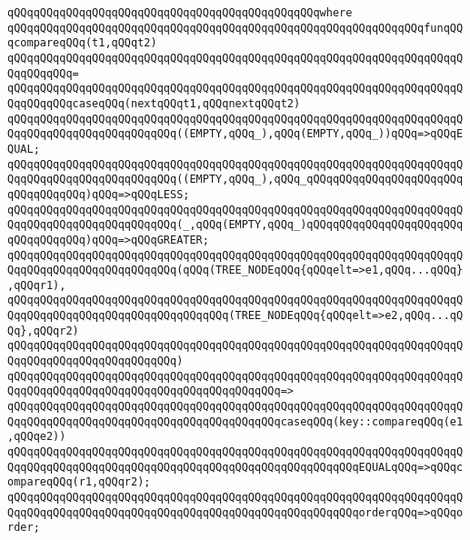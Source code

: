 \verb|qQQqqQQqqQQqqQQqqQQqqQQqqQQqqQQqqQQqqQQqqQQqqQQqwhere|\newline
\newline
\verb|qQQqqQQqqQQqqQQqqQQqqQQqqQQqqQQqqQQqqQQqqQQqqQQqqQQqqQQqqQQqqQQqfunqQQqcompareqQQq(t1,qQQqt2)|\newline
\verb|qQQqqQQqqQQqqQQqqQQqqQQqqQQqqQQqqQQqqQQqqQQqqQQqqQQqqQQqqQQqqQQqqQQqqQQqqQQqqQQq=|\newline
\verb|qQQqqQQqqQQqqQQqqQQqqQQqqQQqqQQqqQQqqQQqqQQqqQQqqQQqqQQqqQQqqQQqqQQqqQQqqQQqqQQqcaseqQQq(nextqQQqt1,qQQqnextqQQqt2)|\newline
\newline
\verb|qQQqqQQqqQQqqQQqqQQqqQQqqQQqqQQqqQQqqQQqqQQqqQQqqQQqqQQqqQQqqQQqqQQqqQQqqQQqqQQqqQQqqQQqqQQqqQQq((EMPTY,qQQq_),qQQq(EMPTY,qQQq_))qQQq=>qQQqEQUAL;|\newline
\verb|qQQqqQQqqQQqqQQqqQQqqQQqqQQqqQQqqQQqqQQqqQQqqQQqqQQqqQQqqQQqqQQqqQQqqQQqqQQqqQQqqQQqqQQqqQQqqQQq((EMPTY,qQQq_),qQQq_qQQqqQQqqQQqqQQqqQQqqQQqqQQqqQQqqQQq)qQQq=>qQQqLESS;|\newline
\verb|qQQqqQQqqQQqqQQqqQQqqQQqqQQqqQQqqQQqqQQqqQQqqQQqqQQqqQQqqQQqqQQqqQQqqQQqqQQqqQQqqQQqqQQqqQQqqQQq(_,qQQq(EMPTY,qQQq_)qQQqqQQqqQQqqQQqqQQqqQQqqQQqqQQqqQQq)qQQq=>qQQqGREATER;|\newline
\newline
\verb|qQQqqQQqqQQqqQQqqQQqqQQqqQQqqQQqqQQqqQQqqQQqqQQqqQQqqQQqqQQqqQQqqQQqqQQqqQQqqQQqqQQqqQQqqQQqqQQq(qQQq(TREE_NODEqQQq{qQQqelt=>e1,qQQq...qQQq},qQQqr1),|\newline
\verb|qQQqqQQqqQQqqQQqqQQqqQQqqQQqqQQqqQQqqQQqqQQqqQQqqQQqqQQqqQQqqQQqqQQqqQQqqQQqqQQqqQQqqQQqqQQqqQQqqQQqqQQq(TREE_NODEqQQq{qQQqelt=>e2,qQQq...qQQq},qQQqr2)|\newline
\verb|qQQqqQQqqQQqqQQqqQQqqQQqqQQqqQQqqQQqqQQqqQQqqQQqqQQqqQQqqQQqqQQqqQQqqQQqqQQqqQQqqQQqqQQqqQQqqQQq)|\newline
\verb|qQQqqQQqqQQqqQQqqQQqqQQqqQQqqQQqqQQqqQQqqQQqqQQqqQQqqQQqqQQqqQQqqQQqqQQqqQQqqQQqqQQqqQQqqQQqqQQqqQQqqQQqqQQqqQQq=>|\newline
\verb|qQQqqQQqqQQqqQQqqQQqqQQqqQQqqQQqqQQqqQQqqQQqqQQqqQQqqQQqqQQqqQQqqQQqqQQqqQQqqQQqqQQqqQQqqQQqqQQqqQQqqQQqqQQqqQQqcaseqQQq(key::compareqQQq(e1,qQQqe2))|\newline
\verb|qQQqqQQqqQQqqQQqqQQqqQQqqQQqqQQqqQQqqQQqqQQqqQQqqQQqqQQqqQQqqQQqqQQqqQQqqQQqqQQqqQQqqQQqqQQqqQQqqQQqqQQqqQQqqQQqqQQqqQQqqQQqEQUALqQQq=>qQQqcompareqQQq(r1,qQQqr2);|\newline
\verb|qQQqqQQqqQQqqQQqqQQqqQQqqQQqqQQqqQQqqQQqqQQqqQQqqQQqqQQqqQQqqQQqqQQqqQQqqQQqqQQqqQQqqQQqqQQqqQQqqQQqqQQqqQQqqQQqqQQqqQQqqQQqorderqQQq=>qQQqorder;|\newline
